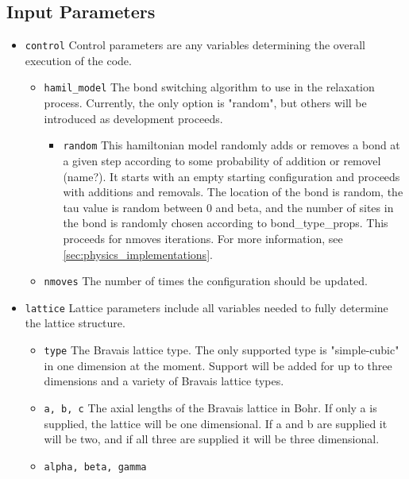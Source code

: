 \subsection{Input Parameters}
\begin{itemize}
  \item \texttt{control}
    Control parameters are any variables determining the overall execution of 
    the code. 
    \begin{itemize}
      \item \texttt{hamil_model}
        The bond switching algorithm to use in the relaxation process.
        Currently, the only option is "random", but others will be introduced
        as development proceeds.
        \begin{itemize}
          \item \texttt{random}
            This hamiltonian model randomly adds or removes a bond at a given
            step according to some probability of addition or removel (name?). 
            It starts with an empty starting configuration and proceeds with
            additions and removals.
            The location of the bond is random, the tau value is random between
            0 and beta, and the number of sites in the bond is randomly chosen
            according to bond_type_props.
            This proceeds for nmoves iterations.
            For more information, see \ref{sec:physics_implementations}.
        \end{itemize}
      \item \texttt{nmoves}
        The number of times the configuration should be updated.
    \end{itemize}
  \item \texttt{lattice}
    Lattice parameters include all variables needed to fully determine the 
    lattice structure. 
    \begin{itemize}
      \item \texttt{type}
        The Bravais lattice type. 
        The only supported type is "simple-cubic" in one dimension at the 
        moment. 
        Support will be added for up to three dimensions and a variety of 
        Bravais lattice types.
      \item \texttt{a, b, c}
        The axial lengths of the Bravais lattice in Bohr.
        If only a is supplied, the lattice will be one dimensional.
        If a and b are supplied it will be two, and if all three are 
        supplied it will be three dimensional. 
      \item \texttt{alpha, beta, gamma}

\end{itemize}
\end{itemize}
